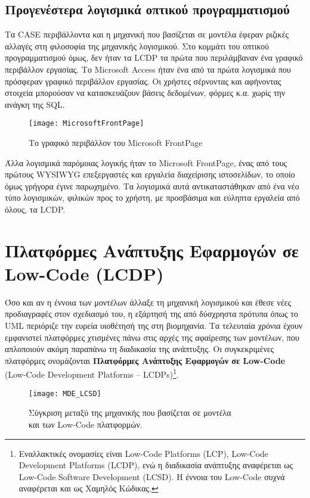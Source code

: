         \subsection{Προγενέστερα λογισμικά οπτικού προγραμματισμού}
            Τα CASE περιβάλλοντα και η μηχανική που βασίζεται σε μοντέλα έφεραν ριζικές αλλαγές στη φιλοσοφία της μηχανικής λογισμικού. Στο κομμάτι του οπτικού προγραμματισμού όμως, δεν ήταν τα LCDP τα πρώτα που περιλάμβαναν ένα γραφικό περιβάλλον εργασίας. Το Microsoft Access ήταν ένα από τα πρώτα λογισμικά που πρόσφεραν γραφικό περιβάλλον εργασίας. Οι χρήστες σέρνοντας και αφήνοντας στοιχεία μπορούσαν να κατασκευάζουν βάσεις δεδομένων, φόρμες κ.α. χωρίς την ανάγκη της SQL.

            \begin{figure}[h!] \noindent \centering
                    \texttt{[image: MicrosoftFrontPage]}
                    \caption{\centering Το γραφικό περιβάλλον του Microsoft FrontPage}
            \end{figure}

            Άλλα λογισμικά παρόμοιας λογικής ήταν το Microsoft FrontPage, ένας από τους πρώτους WYSIWYG επεξεργαστές και εργαλεία διαχείρισης ιστοσελίδων, το οποίο όμως γρήγορα έγινε παρωχημένο. Τα λογισμικά αυτά αντικαταστάθηκαν από ένα νέο τύπο λογισμικών, φιλικών προς το χρήστη, με προσβάσιμα και εύληπτα εργαλεία από όλους, τα LCDP. \cite{LowCodeSimon}

    \section{Πλατφόρμες Ανάπτυξης Εφαρμογών σε Low-Code (LCDP)}
        Όσο και αν η έννοια των μοντέλων άλλαξε τη μηχανική λογισμικού και έθεσε νέες προδιαγραφές στον σχεδιασμό του, η εξάρτησή της από δύσχρηστα πρότυπα όπως το UML περιόριζε την ευρεία υιοθέτησή της στη βιομηχανία. Τα τελευταία χρόνια έχουν εμφανιστεί πλατφόρμες χτισμένες πάνω στις αρχές της αφαίρεσης των μοντέλων, που απλοποιούν ακόμη παραπάνω τη διαδικασία της ανάπτυξης. Οι συγκεκριμένες πλατφόρμες ονομάζονται \textbf{Πλατφόρμες Ανάπτυξης Εφαρμογών σε Low-Code} (Low-Code Development Platforms -- LCDPs)\footnote{Εναλλακτικές ονομασίες είναι Low-Code Platforms (LCP), Low-Code Development Platforms (LCDP), ενώ η διαδικασία ανάπτυξης αναφέρεται ως Low-Code Software Development (LCSD). Η έννοια του Low-Code συχνά αναφέρεται και ως Χαμηλός Κώδικας.}.\cite{Bock2021}

        \begin{figure}[H] \noindent \centering
                \texttt{[image: MDE\_LCSD]}
                \caption{\centering Σύγκριση μεταξύ της μηχανικής που βασίζεται σε μοντέλα \\ και των Low-Code πλατφορμών. \cite{MDELow}}
        \end{figure}

